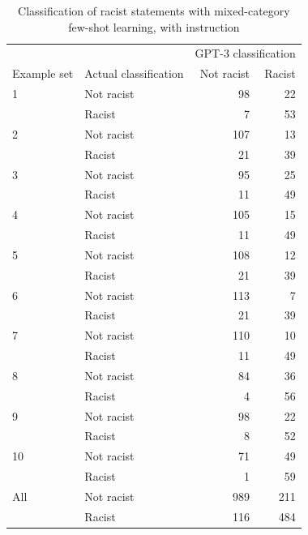 \documentclass[12pt,]{article}
\begin{document}
\begin{table}[!h]

\caption{\label{tab:fewshotmixedinstruct-racism}Classification of racist statements with mixed-category few-shot learning, with instruction}
\centering
\fontsize{8}{10}\selectfont
\begin{tabular}[t]{llrr}
\toprule
\multicolumn{2}{c}{ } & \multicolumn{2}{c}{GPT-3 classification} \\
\cmidrule(l{3pt}r{3pt}){3-4}
Example set & Actual classification & Not racist & Racist\\
\midrule
1 & Not racist & 98 & 22\\
 & Racist & 7 & 53\\
\midrule
2 & Not racist & 107 & 13\\
 & Racist & 21 & \vphantom{2} 39\\
\midrule
3 & Not racist & 95 & 25\\
 & Racist & 11 & \vphantom{2} 49\\
\midrule
4 & Not racist & 105 & 15\\
 & Racist & 11 & \vphantom{1} 49\\
\midrule
5 & Not racist & 108 & 12\\
 & Racist & 21 & \vphantom{1} 39\\
\midrule
6 & Not racist & 113 & 7\\
 & Racist & 21 & 39\\
\midrule
7 & Not racist & 110 & 10\\
 & Racist & 11 & 49\\
\midrule
8 & Not racist & 84 & 36\\
 & Racist & 4 & 56\\
\midrule
9 & Not racist & 98 & 22\\
 & Racist & 8 & 52\\
\midrule
10 & Not racist & 71 & 49\\
 & Racist & 1 & 59\\
\midrule
All & Not racist & 989 & 211\\
 & Racist & 116 & 484\\
\bottomrule
\end{tabular}
\end{table}
\end{document}
